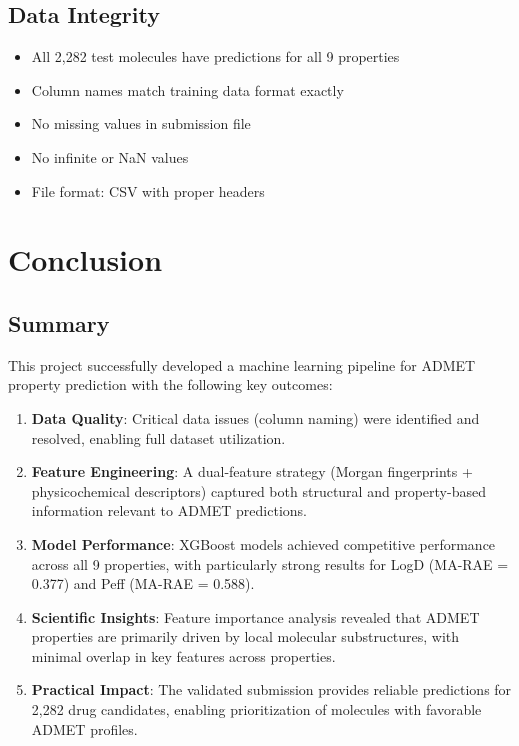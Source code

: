 \documentclass[11pt,a4paper]{article}
\newcommand{\marae}{MA-RAE}
\newcommand{\xgb}{XGBoost}
\newcommand{\admet}{ADMET}
\begin{document}
\subsection{Data Integrity}

\begin{itemize}
    \item[$\checkmark$] All 2,282 test molecules have predictions for all 9 properties
    \item[$\checkmark$] Column names match training data format exactly
    \item[$\checkmark$] No missing values in submission file
    \item[$\checkmark$] No infinite or NaN values
    \item[$\checkmark$] File format: CSV with proper headers
\end{itemize}

\section{Conclusion}

\subsection{Summary}

This project successfully developed a machine learning pipeline for \admet{} property prediction with the following key outcomes:

\begin{enumerate}
    \item \textbf{Data Quality}: Critical data issues (column naming) were identified and resolved, enabling full dataset utilization.

    \item \textbf{Feature Engineering}: A dual-feature strategy (Morgan fingerprints + physicochemical descriptors) captured both structural and property-based information relevant to \admet{} predictions.

    \item \textbf{Model Performance}: \xgb{} models achieved competitive performance across all 9 properties, with particularly strong results for LogD (\marae{} = 0.377) and Peff (\marae{} = 0.588).

    \item \textbf{Scientific Insights}: Feature importance analysis revealed that \admet{} properties are primarily driven by local molecular substructures, with minimal overlap in key features across properties.

    \item \textbf{Practical Impact}: The validated submission provides reliable predictions for 2,282 drug candidates, enabling prioritization of molecules with favorable \admet{} profiles.
\end{enumerate}
\end{document}
